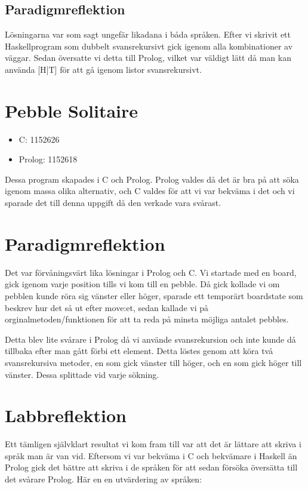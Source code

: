 \documentclass[a4paper]{article}
\begin{document}
\subsection*{Paradigmreflektion}
Lösningarna var som sagt ungefär likadana i båda språken. Efter vi skrivit ett Haskellprogram som dubbelt svansrekursivt gick igenom alla kombinationer av väggar. Sedan översatte vi detta till Prolog, vilket var väldigt lätt då man kan använda [H|T] för att gå igenom listor svansrekursivt.

\section*{Pebble Solitaire}
\begin{itemize}
\item C: 1152626
\item Prolog: 1152618
\end{itemize}
Dessa program skapades i C och Prolog. Prolog valdes då det är bra på att söka igenom massa olika alternativ, och C valdes för att vi var bekväma i det och vi sparade det till denna uppgift då den verkade vara svårast. 

\section*{Paradigmreflektion}
Det var förvåningsvärt lika lösningar i Prolog och C. Vi startade med en board, gick igenom varje position tills vi kom till en pebble. Då gick kollade vi om pebblen kunde röra sig vänster eller höger, sparade ett temporärt boardstate som beskrev hur det så ut efter move:et, sedan kallade vi på orginalmetoden/funktionen för att ta reda på minsta möjliga antalet pebbles.

Detta blev lite svårare i Prolog då vi använde svansrekursion och inte kunde då tillbaka efter man gått förbi ett element. Detta löstes genom att köra två svansrekursiva metoder, en som gick vänster till höger, och en som gick höger till vänster. Dessa splittade vid varje sökning.

\section*{Labbreflektion}
Ett tämligen självklart resultat vi kom fram till var att det är lättare att skriva i språk man är van vid. Eftersom vi var bekväma i C och bekvämare i Haskell än Prolog gick det bättre att skriva i de språken för att sedan försöka översätta till det svårare Prolog. Här en en utvärdering av språken:
\end{document}
